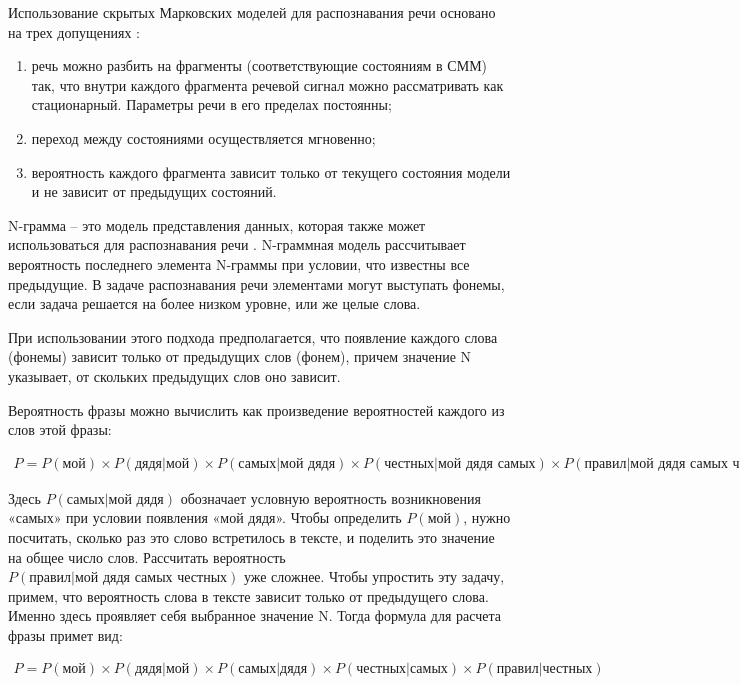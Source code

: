 Использование скрытых Марковских моделей для распознавания речи основано на трех допущениях \cite{4_speach}:
\begin{enumerate}
  \item речь можно разбить на фрагменты (соответствующие состояниям в СММ) так, что внутри каждого фрагмента речевой сигнал можно рассматривать как стационарный. Параметры речи в его пределах постоянны;
  \item переход между состояниями осуществляется мгновенно;
  \item вероятность каждого фрагмента зависит только от текущего состояния модели и не зависит от предыдущих состояний.
\end{enumerate}

N-грамма – это модель представления данных, которая также может использоваться для распознавания речи \cite{5_speach}. 
N-граммная модель рассчитывает вероятность последнего элемента N-граммы при условии, что известны все предыдущие. 
В задаче распознавания речи элементами могут выступать фонемы, если задача решается на более низком уровне, или же целые слова. 

При использовании этого подхода предполагается, что появление каждого слова (фонемы) зависит только от предыдущих слов (фонем),
причем значение N указывает, от скольких предыдущих слов оно зависит. 


Вероятность фразы можно вычислить как произведение вероятностей каждого из слов этой фразы:

\begin{equation}
  \begin{gathered}
  P=P(\text{мой}) \times P(\text{дядя|мой}) \times P(\text{самых|мой дядя}) \times P(\text{честных|мой дядя самых}) \times P(\text{правил|мой дядя самых честных})
  \end{gathered}
  \label{eq:speach_formula_1}
\end{equation}

Здесь $P(\text{самых|мой дядя})$ обозначает условную вероятность возникновения «самых» при условии появления «мой дядя». Чтобы определить $P(\text{мой})$, нужно посчитать, сколько раз это слово встретилось в тексте, и поделить это значение на общее число слов. 
Рассчитать вероятность $P(\text{правил|мой дядя самых честных})$ уже сложнее. Чтобы упростить эту задачу, примем, что вероятность слова в тексте зависит только от предыдущего слова. Именно здесь проявляет себя выбранное значение N. 
Тогда формула для расчета фразы примет вид:

\begin{equation}
  \begin{gathered}
    P = P(\text{мой}) \times P(\text{дядя|мой}) \times P(\text{самых|дядя}) \times P(\text{честных|самых}) \times P(\text{правил|честных})
  \end{gathered}
  \label{eq:speach_formula_2}
\end{equation}

